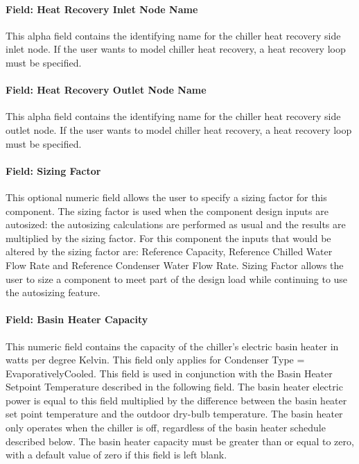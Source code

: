\paragraph{Field: Heat Recovery Inlet Node Name}\label{field-heat-recovery-inlet-node-name-1-000}

This alpha field contains the identifying name for the chiller heat recovery side inlet node. If the user wants to model chiller heat recovery, a heat recovery loop must be specified.

\paragraph{Field: Heat Recovery Outlet Node Name}\label{field-heat-recovery-outlet-node-name-1-000}

This alpha field contains the identifying name for the chiller heat recovery side outlet node. If the user wants to model chiller heat recovery, a heat recovery loop must be specified.

\paragraph{Field: Sizing Factor}\label{field-sizing-factor-4-000}

This optional numeric field allows the user to specify a sizing factor for this component. The sizing factor is used when the component design inputs are autosized: the autosizing calculations are performed as usual and the results are multiplied by the sizing factor. For this component the inputs that would be altered by the sizing factor are: Reference Capacity, Reference Chilled Water Flow Rate and Reference Condenser Water Flow Rate. Sizing Factor allows the user to size a component to meet part of the design load while continuing to use the autosizing feature.

\paragraph{Field: Basin Heater Capacity}\label{field-basin-heater-capacity-2-001}

This numeric field contains the capacity of the chiller's electric basin heater in watts per degree Kelvin. This field only applies for Condenser Type = EvaporativelyCooled. This field is used in conjunction with the Basin Heater Setpoint Temperature described in the following field. The basin heater electric power is equal to this field multiplied by the difference between the basin heater set point temperature and the outdoor dry-bulb temperature. The basin heater only operates when the chiller is off, regardless of the basin heater schedule described below. The basin heater capacity must be greater than or equal to zero, with a default value of zero if this field is left blank.

